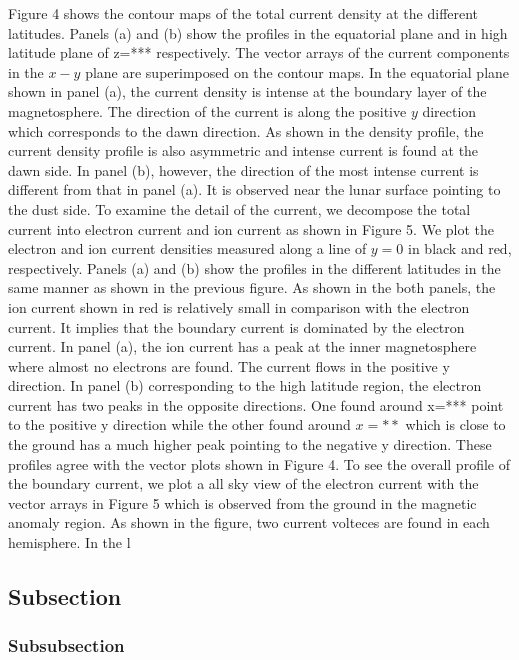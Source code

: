 \documentclass{EPS}
\begin{document}
Figure 4 shows the contour maps of the total current density at the different latitudes. 
Panels (a) and (b) show the profiles in the equatorial plane and in high latitude plane of z=*** respectively. 
The vector arrays of the current components in the $x-y$ plane are superimposed on the contour maps. 
In the equatorial plane shown in panel (a), 
the current density is intense at the boundary layer of the magnetosphere. 
The direction of the current is along the positive $y$ direction which corresponds to the dawn direction. 
As shown in the density profile, the current density profile is also asymmetric and 
intense current is found at the dawn side. 
In panel (b), however, the direction of the most intense current is different from that in panel (a). 
It is observed near the lunar surface pointing to the dust side. 
To examine the detail of the current, we decompose the total current into electron current and 
ion current as shown in Figure 5. 
We plot the electron and ion current densities measured along a line of $y=0$ in black and red, respectively. 
Panels (a) and (b) show the profiles in the different latitudes in the same manner as shown in the previous figure. 
As shown in the both panels, the ion current shown in red is relatively small in comparison with the electron current. 
It implies that the boundary current is dominated by the electron current. 
In panel (a), the ion current has a peak at the inner magnetosphere where almost no electrons are found. 
The current flows in the positive y direction. In panel (b) corresponding to the high latitude region, 
the electron current has two peaks in the opposite directions. 
One found around x=*** point to the positive y direction while the other found around $x=**$ 
which is close to the ground has a much higher peak pointing to the negative y direction. 
These profiles agree with the vector plots shown in Figure 4. 
To see the overall profile of the boundary current, 
we plot a all sky view of the electron current with the vector arrays in Figure 5 
which is observed from the ground in the magnetic anomaly region. 
As shown in the figure, two current volteces are found in each hemisphere. 
In the l








\subsection{Subsection}

\subsubsection{Subsubsection}\strut
\end{document}
